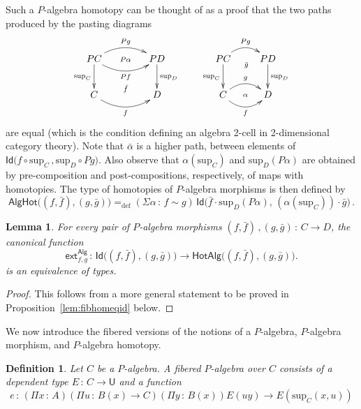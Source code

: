 \documentclass[10pt,a4paper,oneside,reqno]{amsart}
\numberwithin{equation}{section}
\theoremstyle{mythm}
\newtheorem{lemma}[theorem]{Lemma}
\theoremstyle{mydef}
\newtheorem{definition}[theorem]{Definition}
\theoremstyle{myrmk}
\newcommand{\defeq}{=_{\mathrm{def}}}
\newcommand{\co}{\,{:}\,}
\newcommand{\ext}{\mathsf{ext}}
\newcommand{\Id}{\mathsf{Id}}
\newcommand{\U}{\mathsf{U}}
\newcommand{\Palg}{\mathsf{Alg}}
\renewcommand{\sup}{\mathrm{sup}}
\newcommand{\AlgHot}{\mathsf{AlgHot}}
\begin{document}
Such a $P$-algebra homotopy can be thought of as a proof that the two paths produced by the pasting diagrams
\[
\xymatrix@C=1.5cm{
PC \ar@/^1pc/[r]^{Pg}   \ar[d]_{\sup_C}   \ar@/_1pc/[r]_{Pf} \ar@{}[r]|{P\alpha}
& PD \ar[d]^{\sup_D}  \\
C  \ar@/_1pc/[r]_f  \ar@{}[r]^{\bar{f}} & D }
\qquad
\xymatrix{
PC \ar@/^1pc/[r]^{Pg}   \ar[d]_{\sup_C} \ar@{}[r]_(.52){\bar{g}}  & PD \ar[d]^{\sup_D}  \\
C \ar@/^1pc/[r]^g  \ar@/_1pc/[r]_f  \ar@{}[r]|{\alpha} & D }
\]
are equal (which is the condition defining an algebra 2-cell in 2-dimensional category theory). Note that $\bar{\alpha}$ is a higher path, between elements of 
$\Id \big( f \circ \sup_C \, ,  \sup_D \circ Pg \big)$. Also observe that $\alpha(\sup_C)$ and $\sup_D(P \alpha)$ are obtained by pre-composition and post-compositions, respectively, of maps with homotopies.  The type of homotopies of $P$-algebra morphisms is then defined by
\[
\AlgHot \big( (f,\bar{f}), (g, \bar{g})  \big)
 \defeq  
(\Sigma \alpha \co  f \sim g) \, \Id\big( \bar{f} \cdot \sup_D(P \alpha),\, (\alpha(\sup_C))\cdot \bar{g} \big) \, .
\]


\newcommand{\HotAlg}{\mathsf{HotAlg}}


\begin{lemma}\label{IdEqHo}
For every pair of $P$-algebra morphisms $(f, \bar{f}) \, , (g, \bar{g}) \co C \to D$,  
the canonical function
\[
\ext^{\Palg}_{f,g}  \co 
\Id\big((f, \bar{f}), (g, \bar{g})\big) \to \HotAlg \big((f, \bar{f}), (g, \bar{g})\big).
\]
 is an equivalence of types. 
\end{lemma}

\begin{proof}
This follows from a more general statement to be proved in Proposition~\ref{lem:fibhomeqid} below.
\end{proof}


We now introduce the fibered versions of the notions of a $P$-algebra, $P$-algebra morphism, and $P$-algebra homotopy.

\begin{definition} \label{def:fibalg}
Let $C$ be a $P$-algebra. A \emph{fibered $P$-algebra} over $C$ consists of a dependent type $E \co C \to \U$
and a function 
\[
e \co  (\Pi x \co A) (\Pi u \co B(x) \to C)   (\Pi y \co B(x))   E(u y)   \to E(\sup_C(x,u))
 \] 
\end{definition}
\end{document}
